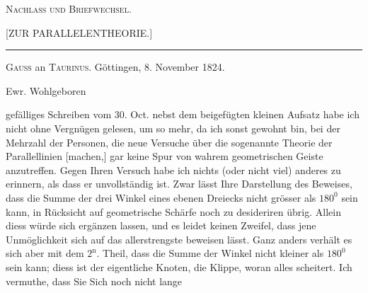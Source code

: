 \clearpage
\begin{center}
{\Large\textsc{Nachlass und Briefwechsel.}}
\end{center}

\bigskip
\begin{center}[ZUR PARALLELENTHEORIE.]\end{center}
\begin{center}\rule{2.5cm}{0.4pt}\end{center}

\begin{center}
\textsc{Gauss} an \textsc{Taurinus}. Göttingen, 8. November 1824.
\end{center}

\begin{center}Ewr. Wohlgeboren\end{center}

gefälliges Schreiben vom 30. Oct. nebst dem beigefügten kleinen Aufsatz habe ich nicht ohne
Vergnügen gelesen, um so mehr, da ich sonst gewohnt bin, bei der Mehrzahl der Personen, die
neue Versuche über die sogenannte Theorie der Parallellinien [machen,] gar keine Spur von
wahrem geometrischen Geiste anzutreffen. Gegen Ihren Versuch habe ich nichts (oder nicht viel)
anderes zu erinnern, als dass er unvollständig ist. Zwar lässt Ihre Darstellung des Beweises,
dass die Summe der drei Winkel eines ebenen Dreiecks nicht grösser als $180^{0}$ sein kann, in
Rücksicht auf geometrische Schärfe noch zu desideriren übrig. Allein diess würde sich
ergänzen lassen, und es leidet keinen Zweifel, dass jene Unmöglichkeit sich auf das
allerstrengste beweisen lässt. Ganz anders verhält es sich aber mit dem $2^{\mathrm n}.$ Theil,
dass die Summe der Winkel nicht kleiner als $180^{0}$ sein kann; diess ist der eigentliche
Knoten, die Klippe, woran alles scheitert. Ich vermuthe, dass Sie Sich noch nicht lange
